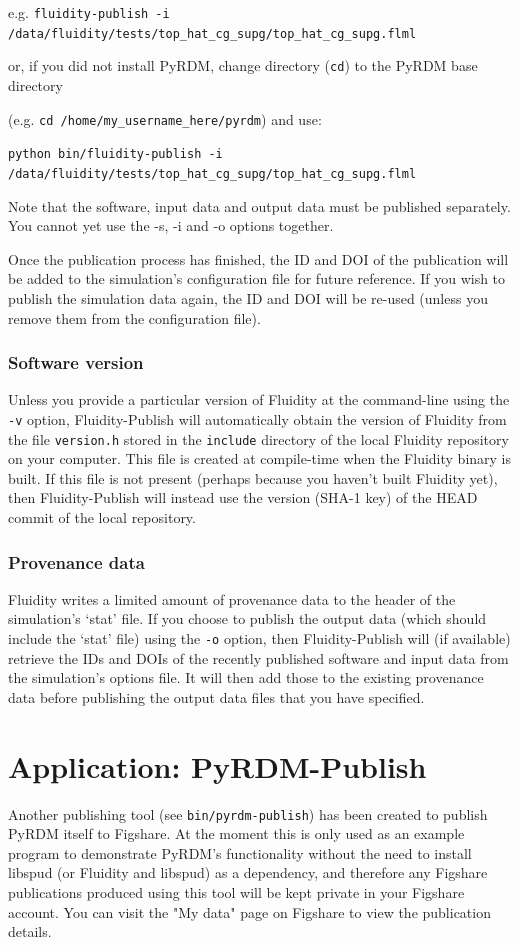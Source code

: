 \documentclass[a4paper,11pt]{report}
\begin{document}
e.g. \texttt{fluidity-publish -i /data/fluidity/tests/top\_hat\_cg\_supg/top\_hat\_cg\_supg.flml}

or, if you did not install PyRDM, change directory (\texttt{cd}) to the PyRDM base directory 

(e.g. \texttt{cd /home/my\_username\_here/pyrdm}) and use:

\texttt{python bin/fluidity-publish -i /data/fluidity/tests/top\_hat\_cg\_supg/top\_hat\_cg\_supg.flml}

Note that the software, input data and output data must be published separately. You cannot yet use the -s, -i and -o options together.

Once the publication process has finished, the ID and DOI of the publication will be added to the simulation's configuration file for future reference. If you wish to publish the simulation data again, the ID and DOI will be re-used (unless you remove them from the configuration file).

\subsection{Software version}
Unless you provide a particular version of Fluidity at the command-line using the \texttt{-v} option, Fluidity-Publish will automatically obtain the version of Fluidity from the file \texttt{version.h} stored in the \texttt{include} directory of the local Fluidity repository on your computer. This file is created at compile-time when the Fluidity binary is built. If this file is not present (perhaps because you haven't built Fluidity yet), then Fluidity-Publish will instead use the version (SHA-1 key) of the HEAD commit of the local repository.

\subsection{Provenance data}
Fluidity writes a limited amount of provenance data to the header of the simulation's `stat' file. If you choose to publish the output data (which should include the `stat' file) using the \texttt{-o} option, then Fluidity-Publish will (if available) retrieve the IDs and DOIs of the recently published software and input data from the simulation's options file. It will then add those to the existing provenance data before publishing the output data files that you have specified.


\chapter{Application: PyRDM-Publish}
Another publishing tool (see \texttt{bin/pyrdm-publish}) has been created to publish PyRDM itself to Figshare. At the moment this is only used as an example program to demonstrate PyRDM's functionality without the need to install libspud (or Fluidity and libspud) as a dependency, and therefore any Figshare publications produced using this tool will be kept private in your Figshare account. You can visit the "My data" page on Figshare to view the publication details.
\end{document}
